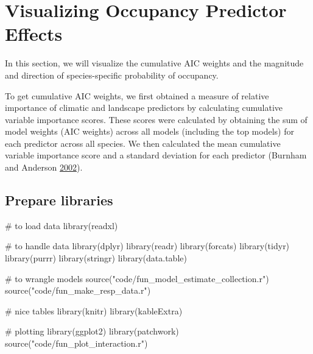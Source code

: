 \documentclass[]{article}
\newenvironment{Shaded}{}{}
\newcommand{\CommentTok}[1]{\textcolor[rgb]{0.00,0.50,0.00}{#1}}
\newcommand{\KeywordTok}[1]{\textcolor[rgb]{0.00,0.00,1.00}{#1}}
\newcommand{\NormalTok}[1]{#1}
\newcommand{\StringTok}[1]{\textcolor[rgb]{0.00,0.50,0.50}{#1}}
\begin{document}
\hypertarget{visualizing-occupancy-predictor-effects}{%
\section{Visualizing Occupancy Predictor Effects}\label{visualizing-occupancy-predictor-effects}}

In this section, we will visualize the cumulative AIC weights and the magnitude and direction of species-specific probability of occupancy.

To get cumulative AIC weights, we first obtained a measure of relative importance of climatic and landscape predictors by calculating cumulative variable importance scores. These scores were calculated by obtaining the sum of model weights (AIC weights) across all models (including the top models) for each predictor across all species. We then calculated the mean cumulative variable importance score and a standard deviation for each predictor (Burnham and Anderson \protect\hyperlink{ref-burnham2002a}{2002}).

\hypertarget{prepare-libraries-3}{%
\subsection{Prepare libraries}\label{prepare-libraries-3}}

\begin{Shaded}
\begin{Highlighting}[numbers=left,,]
\CommentTok{# to load data}
\KeywordTok{library}\NormalTok{(readxl)}

\CommentTok{# to handle data}
\KeywordTok{library}\NormalTok{(dplyr)}
\KeywordTok{library}\NormalTok{(readr)}
\KeywordTok{library}\NormalTok{(forcats)}
\KeywordTok{library}\NormalTok{(tidyr)}
\KeywordTok{library}\NormalTok{(purrr)}
\KeywordTok{library}\NormalTok{(stringr)}
\KeywordTok{library}\NormalTok{(data.table)}

\CommentTok{# to wrangle models}
\KeywordTok{source}\NormalTok{(}\StringTok{"code/fun_model_estimate_collection.r"}\NormalTok{)}
\KeywordTok{source}\NormalTok{(}\StringTok{"code/fun_make_resp_data.r"}\NormalTok{)}

\CommentTok{# nice tables}
\KeywordTok{library}\NormalTok{(knitr)}
\KeywordTok{library}\NormalTok{(kableExtra)}

\CommentTok{# plotting}
\KeywordTok{library}\NormalTok{(ggplot2)}
\KeywordTok{library}\NormalTok{(patchwork)}
\KeywordTok{source}\NormalTok{(}\StringTok{"code/fun_plot_interaction.r"}\NormalTok{)}
\end{Highlighting}
\end{Shaded}
\end{document}
